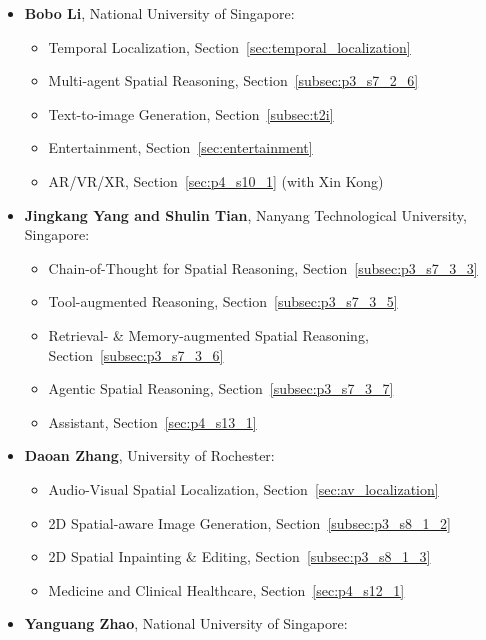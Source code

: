 \begin{itemize}[leftmargin=*]
\begin{itemize}
            \item Warehouse and Industrial Logistics, Section~\ref{sec:p4_s9_5}
        \end{itemize}
    \item \textbf{Bobo Li}, National University of Singapore:
        \begin{itemize}
            \item Temporal Localization, Section~\ref{sec:temporal_localization}
            \item Multi-agent Spatial Reasoning, Section~\ref{subsec:p3_s7_2_6}
            \item Text-to-image Generation, Section~\ref{subsec:t2i}
            \item Entertainment, Section~\ref{sec:entertainment}
            \item AR/VR/XR, Section~\ref{sec:p4_s10_1} (with Xin Kong)
        \end{itemize}
    \item \textbf{Jingkang Yang and Shulin Tian}, Nanyang Technological University, Singapore:
        \begin{itemize}
            \item Chain-of-Thought for Spatial Reasoning, Section~\ref{subsec:p3_s7_3_3}
            \item Tool-augmented Reasoning, Section~\ref{subsec:p3_s7_3_5}
            \item Retrieval- \& Memory-augmented Spatial Reasoning, Section~\ref{subsec:p3_s7_3_6}
            \item Agentic Spatial Reasoning, Section~\ref{subsec:p3_s7_3_7}
            \item Assistant, Section~\ref{sec:p4_s13_1}
        \end{itemize}
    \item \textbf{Daoan Zhang}, University of Rochester:
        \begin{itemize}
            \item Audio-Visual Spatial Localization, Section~\ref{sec:av_localization}
            \item 2D Spatial-aware Image Generation, Section~\ref{subsec:p3_s8_1_2}
            \item 2D Spatial Inpainting \& Editing, Section~\ref{subsec:p3_s8_1_3}
            \item Medicine and Clinical Healthcare, Section~\ref{sec:p4_s12_1}
        \end{itemize}
    \item \textbf{Yanguang Zhao}, National University of Singapore:

\end{itemize}
